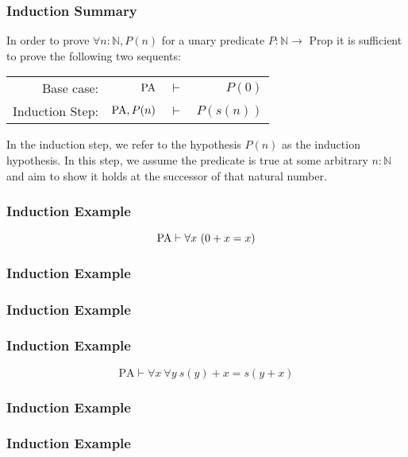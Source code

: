 \documentclass{beamer}
\theoremstyle{indentDefn} \newtheorem{defn}[]{Definition}
\begin{document}
\begin{frame}
	\frametitle{Induction Summary}

	In order to prove $\forall n : \mathbb{N}, P(n)$ for a unary predicate $P: \mathbb{N} \to $ Prop it is sufficient to prove the following two sequents: 

	\begin{tabular}{r r c r}
		Base case: & $\text{PA}$  & $\vdash$ & $P (0)$ \\
		Induction Step: & $\text{PA}, P(n)$ & $\vdash$ & $P (s(n))$
	\end{tabular}

	In the induction step, we refer to the hypothesis $P(n)$ as the induction hypothesis. In this step, we assume the predicate is true at some arbitrary $n : \mathbb{N}$ and aim to show it holds at the successor of that natural number. 

\end{frame}

\begin{frame}
	\frametitle{Induction Example}
	
	$$ \text{PA} \vdash \forall x \ (0 + x = x)$$
	
	\vspace{65mm}
	
\end{frame}

\begin{frame}
	\frametitle{Induction Example}

\end{frame}

\begin{frame}
	\frametitle{Induction Example}

	

\end{frame}

\begin{frame}
	\frametitle{Induction Example}
	$$\text{PA} \vdash \forall x \ \forall y \ s(y) + x = s(y+x)$$

	\vspace{6cm}	

\end{frame}

\begin{frame}
	\frametitle{Induction Example}

	

\end{frame}

\begin{frame}
	\frametitle{Induction Example}

	

\end{frame}
\end{document}
